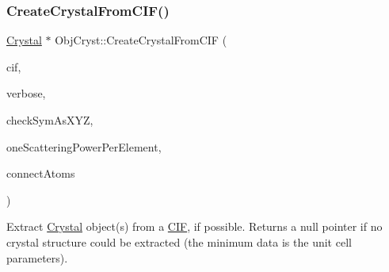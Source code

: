 \subsubsection{\texorpdfstring{CreateCrystalFromCIF()}{CreateCrystalFromCIF()}\hspace{0.1cm}{\footnotesize\ttfamily [2/2]}}
{\footnotesize\ttfamily \mbox{\hyperlink{class_obj_cryst_1_1_crystal}{Crystal}} $\ast$ Obj\+Cryst\+::\+Create\+Crystal\+From\+C\+IF (\begin{DoxyParamCaption}\item[{\mbox{\hyperlink{class_obj_cryst_1_1_c_i_f}{C\+IF}} \&}]{cif,  }\item[{const bool}]{verbose,  }\item[{const bool}]{check\+Sym\+As\+X\+YZ,  }\item[{const bool}]{one\+Scattering\+Power\+Per\+Element,  }\item[{const bool}]{connect\+Atoms }\end{DoxyParamCaption})}

Extract \mbox{\hyperlink{class_obj_cryst_1_1_crystal}{Crystal}} object(s) from a \mbox{\hyperlink{class_obj_cryst_1_1_c_i_f}{C\+IF}}, if possible. Returns a null pointer if no crystal structure could be extracted (the minimum data is the unit cell parameters).


